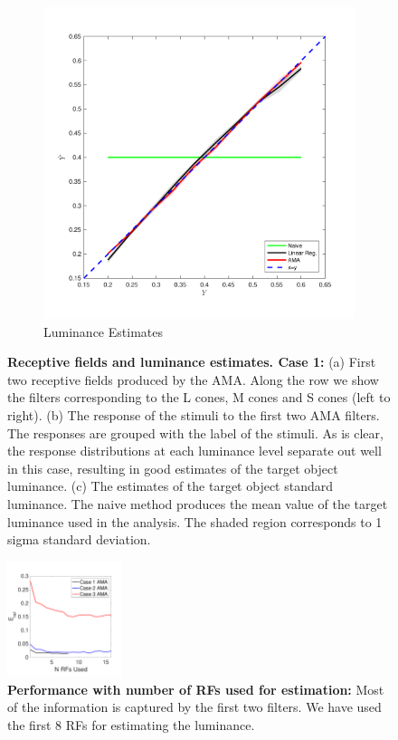 \documentclass{jov}
\begin{document}
\begin{figure}
        \begin{subfigure}[b]{0.20 \textwidth}
        \includegraphics[width=\textwidth]{../Figures/Figure9/Figure9_c.pdf}
        \caption{Luminance Estimates}
        \label{fig:case9Results}
    \end{subfigure}    
    \caption{{\bf Receptive fields and luminance estimates. Case 1:} (a) First two receptive fields produced by the AMA. Along the row we show the filters corresponding to the L cones, M cones and S cones (left to right). (b) The response of the stimuli to the first two AMA filters. The responses are grouped with the label of the stimuli. As is clear, the response distributions at each luminance level separate out well in this case, resulting in good estimates of the target object luminance. (c) The estimates of the target object standard luminance. The naive method produces the mean value of the target luminance used in the analysis. The shaded region corresponds to 1 sigma standard deviation.}
\label{fig:case9AllResults}
\end{figure}

\begin{figure}
\centering
\includegraphics[width=0.3\textwidth]{../Figures/Figure10/Figure10.pdf}
\caption{{\bf Performance with number of RFs used for estimation:} Most of the information is captured by the first two filters. We have used the first 8 RFs for estimating the luminance.}
\label{fig:RMSEvsNFilters}
\end{figure}
\end{document}

